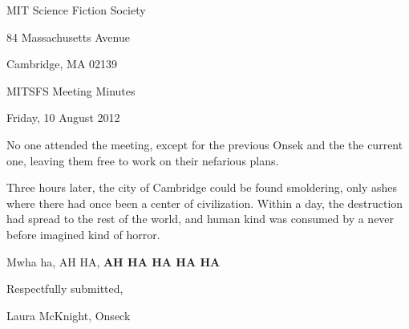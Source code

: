\documentclass[10pt]{article}
\newcommand{\onseck}{Laura McKnight, Onseck}
\newcommand{\meetingdate}{Friday, 10 August 2012}
\begin{document}
\begin{center}

MIT Science Fiction Society

84 Massachusetts Avenue

Cambridge, MA 02139

\vspace{12pt}

MITSFS Meeting Minutes

\meetingdate

\end{center}

\vspace{18pt}

\setlength{\parskip}{6pt}

No one attended the meeting, except for the previous Onsek and the the current one, leaving them free to work on their nefarious plans. 

Three hours later, the city of Cambridge could be found smoldering, only ashes where there had once been a center of civilization. Within a day, the destruction had spread to the rest of the world, and human kind was consumed by a never before imagined kind of horror.

Mwha ha, AH HA, \textbf{AH HA HA HA HA}

\vspace{18pt}

\centerline{Respectfully submitted,}
\centerline{\onseck}
\end{document}
